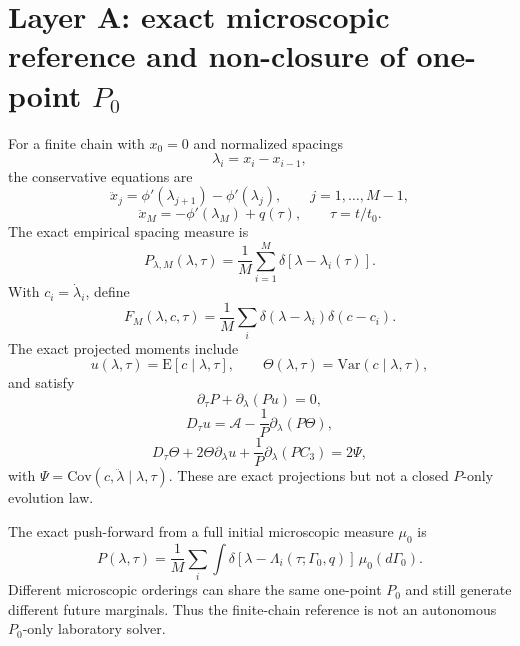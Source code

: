 \documentclass[11pt]{article}
\newcommand{\Eop}{\mathrm{E}}
\newcommand{\Var}{\mathrm{Var}}
\newcommand{\Cov}{\mathrm{Cov}}
\begin{document}
\section{Layer A: exact microscopic reference and non-closure of one-point $P_0$}
For a finite chain with $x_0=0$ and normalized spacings
\begin{equation}
\lambda_i=x_i-x_{i-1},
\end{equation}
the conservative equations are
\begin{equation}
\ddot x_j=\phi'(\lambda_{j+1})-\phi'(\lambda_j),
\qquad j=1,\ldots,M-1,
\end{equation}
\begin{equation}
\ddot x_M=-\phi'(\lambda_M)+q(\tau),
\qquad \tau=t/t_0.
\end{equation}
The exact empirical spacing measure is
\begin{equation}
P_{\lambda,M}(\lambda,\tau)
=\frac1M\sum_{i=1}^{M}\delta[\lambda-\lambda_i(\tau)].
\end{equation}
With $c_i=\dot\lambda_i$, define
\begin{equation}
F_M(\lambda,c,\tau)
=\frac1M\sum_i\delta(\lambda-\lambda_i)\delta(c-c_i).
\end{equation}
The exact projected moments include
\begin{equation}
 u(\lambda,\tau)=\Eop[c\mid\lambda,\tau],
\qquad
\Theta(\lambda,\tau)=\Var(c\mid\lambda,\tau),
\end{equation}
and satisfy
\begin{equation}
\partial_\tau P+\partial_\lambda(Pu)=0,
\end{equation}
\begin{equation}
D_\tau u=\mathcal A-\frac1P\partial_\lambda(P\Theta),
\end{equation}
\begin{equation}
D_\tau\Theta+2\Theta\partial_\lambda u
+\frac1P\partial_\lambda(PC_3)=2\Psi,
\end{equation}
with $\Psi=\Cov(c,\ddot\lambda\mid\lambda,\tau)$. These are exact projections but not a closed $P$-only evolution law.

The exact push-forward from a full initial microscopic measure $\mu_0$ is
\begin{equation}
P(\lambda,\tau)
=\frac1M\sum_i\int
\delta[\lambda-\Lambda_i(\tau;\Gamma_0,q)]\,\mu_0(d\Gamma_0).
\end{equation}
Different microscopic orderings can share the same one-point $P_0$ and still generate different future marginals. Thus the finite-chain reference is not an autonomous $P_0$-only laboratory solver.
\end{document}
